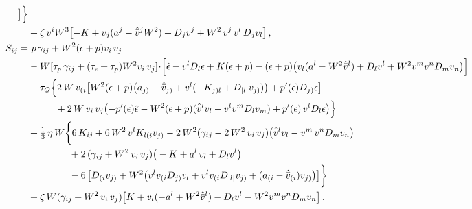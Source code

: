 \documentclass[prd,aps,twocolumn,floats,floatfix,nofootinbib,superscriptaddress] {revtex4-1}
\begin{document}
\begin{widetext}
\begin{align}
     \bigr]
    \Bigr\} \nonumber\\
    &+\zeta\,v^{i} W^3 \bigl[- K + v_{j} (a^{j} -  \hat{\bar v}^{j} W^2) + D_{j}v^{j} + W^2\,v^{j} \,v^{l}\,  D_{j}v_{l}\bigr]\,, \label{eq:Si_fluid_3p1}\\
    S_{ij} =&~ p\,\gamma_{ij}+  W^2 (\epsilon+p)v_{i}\,v_{j} \nonumber\\
    &- W [\tau_p\,\gamma_{ij} + (\tau_\epsilon+\tau_p)W^2 v_{i}\, v_{j}]\! \cdot\!\Bigl[\hat\epsilon -  v^{l} D_{l}\epsilon+ K (\epsilon + p)  
    -  (\epsilon + p) \bigl(v_{l} (a^{l} - W^2 \hat{\bar v}^{l}) + D_{l}v^{l} +W^2 v^{m} v^{n} D_{m}v_{n}\bigr)\Bigr]\nonumber\\
    &+\tau_Q\Bigl\{
    2\,W\,v_{(i}\bigl[W^2 (\epsilon + p) \bigl(a_{j)} -  \hat{\bar v}_{j)} + v^{l} (- K_{j)l} + D_{|l|}v_{j)})\bigr) + p'(\epsilon) D_{j)}\epsilon\bigr] \nonumber\\
    &\hspace{1cm}+2\,W\,v_i\,v_j\bigl(- p'(\epsilon) \hat\epsilon - W^2 (\epsilon + p)( \hat{\bar v}^{l} v_{l}  - v^{l} v^{m}  D_{l}v_{m}) + p'(\epsilon)\, v^{l} D_l\epsilon\bigr)
    \Bigr\}\nonumber\\
    &+\tfrac{1}{3}\,\eta\, W \biggl\{
    6 \,K_{ij}+6\, W^2 \,v^{l}K_{l(i} v_{j)} - 2 \,W^2 (\gamma_{ij}-2\,W^2\,v_i\,v_j)\big(\hat{\bar v}^{l} v_{l}-v^m\,v^nD_m v_n\big)\nonumber\\
    &\hspace{1.5cm}+2\,(\gamma_{ij} +W^2\, v_{i} \,v_{j} )\big(-K+a^l\,v_l+D_lv^l\bigr)\nonumber\\
    &\hspace{1.5cm}-6\,\bigl[ D_{(i}v_{j)} 
    + W^2\bigl(  v^{l} v_{(i} D_{j)}v_{l} + v^{l}v_{(i}  D_{|l|}v_{j)} + (a_{(i} -  \hat{\bar v}_{(i}) v_{j)}\bigr)
    \bigr]
    \biggr\} \nonumber\\
    &+\zeta\,W (\gamma_{ij} +W^2\, v_{i}\, v_{j} ) \bigl[K + v_{l} (- a^{l} + W^2\hat{\bar v}^{l} ) -  D_{l}v^{l} - W^2 v^{m} v^{n}  D_{m}v_{n}\bigr]\,. \label{eq:Sij_fluid_3p1}
\end{align}
\end{widetext}
\end{document}
